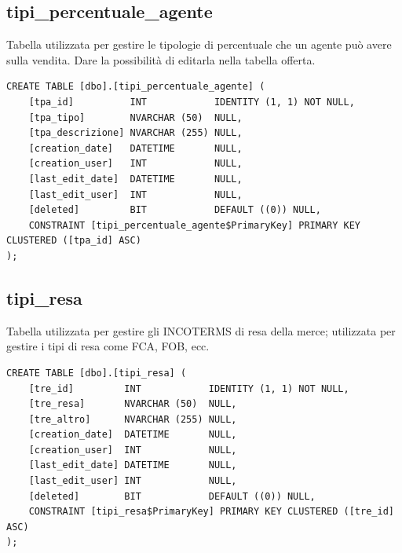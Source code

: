 \documentclass[12pt]{article}
\begin{document}
\subsection{tipi\_percentuale\_agente}
Tabella utilizzata per gestire le tipologie di percentuale che un agente può avere sulla vendita.
Dare la possibilità di editarla nella tabella offerta.
\begin{lstlisting}
CREATE TABLE [dbo].[tipi_percentuale_agente] (
    [tpa_id]          INT            IDENTITY (1, 1) NOT NULL,
    [tpa_tipo]        NVARCHAR (50)  NULL,
    [tpa_descrizione] NVARCHAR (255) NULL,
    [creation_date]   DATETIME       NULL,
    [creation_user]   INT            NULL,
    [last_edit_date]  DATETIME       NULL,
    [last_edit_user]  INT            NULL,
    [deleted]         BIT            DEFAULT ((0)) NULL,
    CONSTRAINT [tipi_percentuale_agente$PrimaryKey] PRIMARY KEY CLUSTERED ([tpa_id] ASC)
);
\end{lstlisting}

\subsection{tipi\_resa}
Tabella utilizzata per gestire gli INCOTERMS di resa della merce; utilizzata per gestire i tipi di resa come FCA, FOB, ecc.
\begin{lstlisting}
CREATE TABLE [dbo].[tipi_resa] (
    [tre_id]         INT            IDENTITY (1, 1) NOT NULL,
    [tre_resa]       NVARCHAR (50)  NULL,
    [tre_altro]      NVARCHAR (255) NULL,
    [creation_date]  DATETIME       NULL,
    [creation_user]  INT            NULL,
    [last_edit_date] DATETIME       NULL,
    [last_edit_user] INT            NULL,
    [deleted]        BIT            DEFAULT ((0)) NULL,
    CONSTRAINT [tipi_resa$PrimaryKey] PRIMARY KEY CLUSTERED ([tre_id] ASC)
);
\end{lstlisting}
\end{document}
